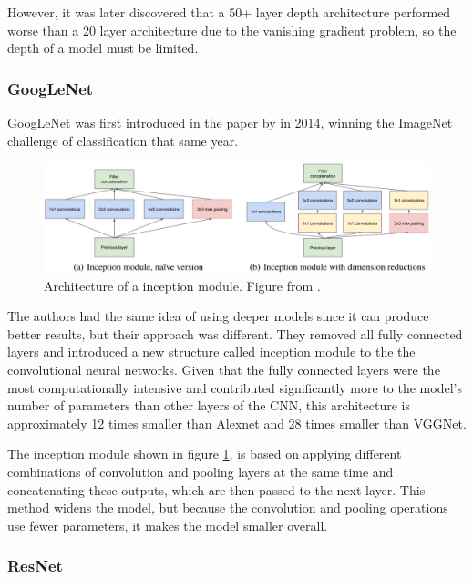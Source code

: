 \documentclass{report}[12pt, a4paper]
\begin{document}
However, it was later discovered that a 50+ layer depth architecture performed worse than a 20 layer architecture due to the vanishing gradient problem, so the depth of a model must be limited.

\subsubsection{GoogLeNet}

GoogLeNet was first introduced in the paper  \cite{googlenet_paper} by \citeauthor{googlenet_paper} in 2014, winning the ImageNet challenge of classification that same year.

\begin{figure}[htp]
    \centering
    \includegraphics[width=14cm]{inception_module}
    \caption{Architecture of a inception module. Figure from \cite{googlenet_paper}.}
    \label{fig:inception_module}
\end{figure}

The authors had the same idea of using deeper models since it can produce better results, but their approach was different. They removed all fully connected layers and introduced a new structure called inception module to the the convolutional neural networks. Given that the fully connected layers were the most computationally intensive and contributed significantly more to the model's number of parameters than other layers of the CNN, this architecture is approximately 12 times smaller than Alexnet and 28 times smaller than VGGNet.

The inception module shown in figure \ref{fig:inception_module}, is based on applying different combinations of convolution and pooling layers at the same time and concatenating these outputs, which are then passed to the next layer. This method widens the model, but because the convolution and pooling operations use fewer parameters, it makes the model smaller overall.

\subsubsection{ResNet}
\end{document}
